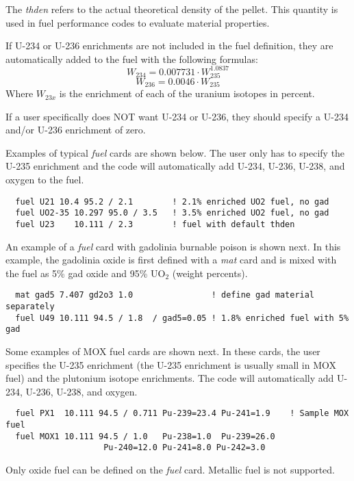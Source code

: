 The {\it thden} refers to the actual theoretical density of the pellet.  This quantity is
used in fuel performance codes to evaluate material properties.

If U-234 or U-236 enrichments are not included in the fuel definition, they are automatically
added to the fuel with the following formulas:
\begin{equation}
   W_{234} = 0.007731 \cdot W_{235}^{1.0837}
\end{equation}
\begin{equation}
  W_{236} = 0.0046 \cdot W_{235}
\end{equation}
Where $W_{23x}$ is the enrichment of each of the uranium isotopes in percent.

If a user specifically does NOT want U-234 or U-236, they should specify a U-234 
and/or U-236 enrichment of zero.

Examples of typical {\it fuel} cards are shown below.  The user
only has to specify the U-235 enrichment and the code will automatically add
U-234, U-236, U-238, and oxygen to the fuel.
\begin{verbatim}
  fuel U21 10.4 95.2 / 2.1        ! 2.1% enriched UO2 fuel, no gad
  fuel UO2-35 10.297 95.0 / 3.5   ! 3.5% enriched UO2 fuel, no gad
  fuel U23    10.111 / 2.3        ! fuel with default thden
\end{verbatim}

An example of a {\it fuel} card with gadolinia burnable poison is shown next.
In this example, the gadolinia oxide is first defined with a {\it mat} card and 
is mixed with the fuel as 5\%  gad oxide and 95\% UO$_2$ (weight percents). 
\begin{verbatim}
  mat gad5 7.407 gd2o3 1.0                ! define gad material separately
  fuel U49 10.111 94.5 / 1.8  / gad5=0.05 ! 1.8% enriched fuel with 5% gad
\end{verbatim}

Some examples of MOX fuel cards are shown next.  In these cards, the user specifies
the U-235 enrichment (the U-235 enrichment is usually small in MOX fuel) and the
plutonium isotope enrichments.  The code will automatically add U-234, U-236, U-238,
and oxygen.
\begin{verbatim}
  fuel PX1  10.111 94.5 / 0.711 Pu-239=23.4 Pu-241=1.9    ! Sample MOX fuel
  fuel MOX1 10.111 94.5 / 1.0   Pu-238=1.0  Pu-239=26.0 
                    Pu-240=12.0 Pu-241=8.0 Pu-242=3.0 
\end{verbatim}

Only oxide fuel can be defined on the {\it fuel} card. Metallic fuel is not supported.

